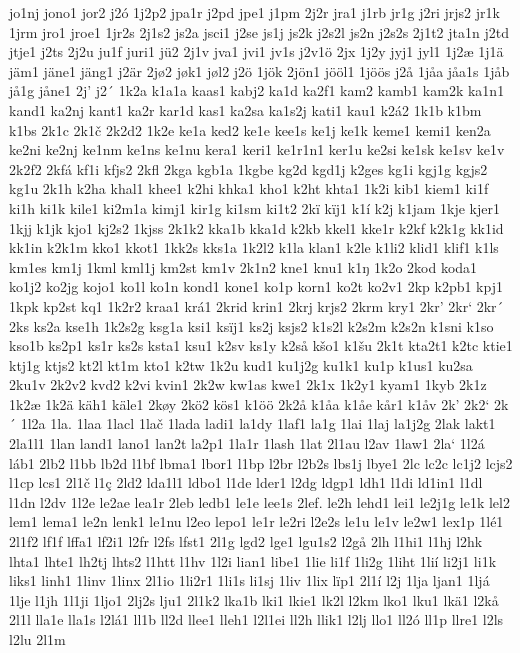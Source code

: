 jo1nj
jono1
jor2
j2ó
1j2p2
jpa1r
j2pd
jpe1
j1pm
2j2r
jra1
j1rb
jr1g
j2ri
jrjs2
jr1k
1jrm
jro1
jroe1
1jr2s
2j1s2
js2a
jsci1
j2se
js1j
js2k
j2s2l
js2n
j2s2s
2j1t2
jta1n
j2td
jtje1
j2ts
2j2u
ju1f
juri1
jü2
2j1v
jva1
jvi1
jv1s
j2v1ö
2jx
1j2y
jyj1
jyl1
1j2æ
1j1ä
jäm1
jäne1
jäng1
j2är
2jø2
jøk1
jøl2
j2ö
1jök
2jön1
jööl1
1jöös
j2å
1jåa
jåa1s
1jåb
jå1g
jåne1
2j'
j2´
1k2a
k1a1a
kaas1
kabj2
ka1d
ka2f1
kam2
kamb1
kam2k
ka1n1
kand1
ka2nj
kant1
ka2r
kar1d
kas1
ka2sa
ka1s2j
kati1
kau1
k2á2
1k1b
k1bm
k1bs
2k1c
2k1č
2k2d2
1k2e
ke1a
ked2
ke1e
kee1s
ke1j
ke1k
keme1
kemi1
ken2a
ke2ni
ke2nj
ke1nm
ke1ns
ke1nu
kera1
keri1
ke1r1n1
ker1u
ke2si
ke1sk
ke1sv
ke1v
2k2f2
2kfá
kf1i
kfjs2
2kfl
2kga
kgb1a
1kgbe
kg2d
kgd1j
k2ges
kg1i
kgj1g
kgjs2
kg1u
2k1h
k2ha
khal1
khee1
k2hi
khka1
kho1
k2ht
khta1
1k2i
kib1
kiem1
ki1f
ki1h
ki1k
kile1
ki2m1a
kimj1
kir1g
ki1sm
ki1t2
2kï
kïj1
k1í
k2j
k1jam
1kje
kjer1
1kjj
k1jk
kjo1
kj2s2
1kjss
2k1k2
kka1b
kka1d
k2kb
kkel1
kke1r
k2kf
k2k1g
kk1id
kk1in
k2k1m
kko1
kkot1
1kk2s
kks1a
1k2l2
k1la
klan1
k2le
k1li2
klid1
klif1
k1ls
km1es
km1j
1kml
kml1j
km2st
km1v
2k1n2
kne1
knu1
k1ŋ
1k2o
2kod
koda1
ko1j2
ko2jg
kojo1
ko1l
ko1n
kond1
kone1
ko1p
korn1
ko2t
ko2v1
2kp
k2pb1
kpj1
1kpk
kp2st
kq1
1k2r2
kraa1
krá1
2krid
krin1
2krj
krjs2
2krm
kry1
2kr'
2kr`
2kr´
2ks
ks2a
kse1h
1k2s2g
ksg1a
ksi1
ksïj1
ks2j
ksjs2
k1s2l
k2s2m
k2s2n
k1sni
k1so
kso1b
ks2p1
ks1r
ks2s
ksta1
ksu1
k2sv
ks1y
k2så
kšo1
k1šu
2k1t
kta2t1
k2tc
ktie1
ktj1g
ktjs2
kt2l
kt1m
kto1
k2tw
1k2u
kud1
ku1j2g
ku1k1
ku1p
k1us1
ku2sa
2ku1v
2k2v2
kvd2
k2vi
kvin1
2k2w
kw1as
kwe1
2k1x
1k2y1
kyam1
1kyb
2k1z
1k2æ
1k2ä
käh1
käle1
2køy
2kö2
kös1
k1öö
2k2å
k1åa
k1åe
kår1
k1åv
2k'
2k2`
2k´
1l2a
1la.
1laa
1lacl
1lač
1lada
ladi1
la1dy
1laf1
la1g
1lai
1laj
la1j2g
2lak
lakt1
2la1l1
1lan
land1
lano1
lan2t
la2p1
1la1r
1lash
1lat
2l1au
l2av
1law1
2la`
1l2á
láb1
2lb2
l1bb
lb2d
l1bf
lbma1
lbor1
l1bp
l2br
l2b2s
lbs1j
lbye1
2lc
lc2c
lc1j2
lcjs2
l1cp
lcs1
2l1č
l1ç
2ld2
lda1l1
ldbo1
l1de
lder1
l2dg
ldgp1
ldh1
l1di
ld1in1
l1dl
l1dn
l2dv
1l2e
le2ae
lea1r
2leb
ledb1
le1e
lee1s
2lef.
le2h
lehd1
lei1
le2j1g
le1k
lel2
lem1
lema1
le2n
lenk1
le1nu
l2eo
lepo1
le1r
le2ri
l2e2s
le1u
le1v
le2w1
lex1p
1lé1
2l1f2
lf1f
lffa1
lf2i1
l2fr
l2fs
lfst1
2l1g
lgd2
lge1
lgu1s2
l2gå
2lh
l1hi1
l1hj
l2hk
lhta1
lhte1
lh2tj
lhts2
l1htt
l1hv
1l2i
lian1
libe1
1lie
li1f
1li2g
1liht
1lií
li2j1
li1k
liks1
linh1
1linv
1linx
2l1io
1li2r1
1li1s
li1sj
1liv
1lix
lïp1
2l1í
l2j
1lja
ljan1
1ljá
1lje
l1jh
1l1ji
1ljo1
2lj2s
lju1
2l1k2
lka1b
lki1
lkie1
lk2l
l2km
lko1
lku1
lkä1
l2kå
2l1l
lla1e
lla1s
l2lá1
ll1b
ll2d
llee1
lleh1
l2l1ei
ll2h
llik1
l2lj
llo1
ll2ó
ll1p
llre1
l2ls
l2lu
2l1m
